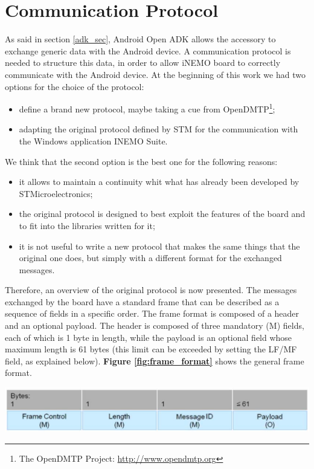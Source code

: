 \section{Communication Protocol}
\label{cp_sec}

As said in section \ref{adk_sec}, Android Open ADK allows the accessory to exchange generic data with the Android device. A communication protocol is needed to structure this data, in order to allow iNEMO board to correctly communicate with the Android device. At the beginning of this work we had two options for the choice of the protocol:

\begin{itemize}
	\item define a brand new protocol, maybe taking a cue from OpenDMTP\footnote{The OpenDMTP Project: \url{http://www.opendmtp.org}};
	\item adapting the original protocol defined by STM for the communication with the Windows application INEMO Suite.
\end{itemize}

We think that the second option is the best one for the following reasons:

\begin{itemize}
	\item it allows to maintain a continuity whit what has already been developed by STMicroelectronics;
	\item the original protocol is designed to best exploit the features of the board and to fit into the libraries written for it;
	\item it is not useful to write a new protocol that makes the same things that the original one does, but simply with a different format for the exchanged messages.
\end{itemize}

Therefore, an overview of the original protocol is now presented. The messages exchanged by the board have a standard frame that can be described as a sequence of fields in a specific order. The frame format is composed of a header and an optional payload. The header is composed of three mandatory (M) fields, each of which is 1 byte in length, while the payload is an optional field whose maximum length is 61 bytes (this limit can be exceeded by setting the LF/MF field, as explained below). {\bf Figure \ref{fig:frame_format}} shows the general frame format. 

\begin{center}
	\includegraphics[width=1\linewidth]{pics/frame_format.eps}
	\label{fig:frame_format}
\end{center}

